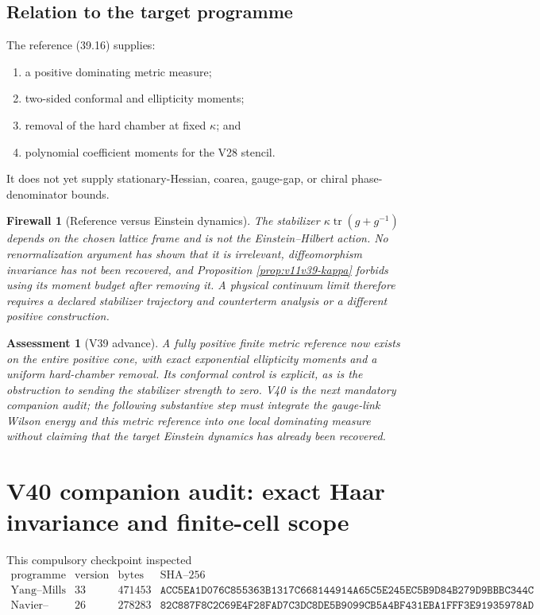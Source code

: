 \documentclass[11pt]{article}
\newtheorem{assessment}[theorem]{Assessment}
\newtheorem{firewall}[theorem]{Firewall}
\begin{document}
\subsection{Relation to the target programme}

The reference (39.16) supplies:
\begin{enumerate}[label=\textnormal{(\roman*)}]
\item a positive dominating metric measure;
\item two-sided conformal and ellipticity moments;
\item removal of the hard chamber at fixed \(\kappa\); and
\item polynomial coefficient moments for the V28 stencil.
\end{enumerate}
It does not yet supply stationary-Hessian, coarea, gauge-gap, or chiral
phase-denominator bounds.

\begin{firewall}[Reference versus Einstein dynamics]
\label{fw:v11v39-reference}
The stabilizer \(\kappa\operatorname{tr}(g+g^{-1})\) depends on the
chosen lattice frame and is not the Einstein--Hilbert action.  No
renormalization argument has shown that it is irrelevant, diffeomorphism
invariance has not been recovered, and Proposition
\ref{prop:v11v39-kappa} forbids using its moment budget after removing
it.  A physical continuum limit therefore requires a declared
stabilizer trajectory and counterterm analysis or a different positive
construction.
\end{firewall}

\begin{assessment}[V39 advance]
\label{ass:v11v39}
A fully positive finite metric reference now exists on the entire
positive cone, with exact exponential ellipticity moments and a
uniform hard-chamber removal.  Its conformal control is explicit, as is
the obstruction to sending the stabilizer strength to zero.  V40 is the
next mandatory companion audit; the following substantive step must
integrate the gauge-link Wilson energy and this metric reference into
one local dominating measure without claiming that the target Einstein
dynamics has already been recovered.
\end{assessment}
\section{V40 companion audit: exact Haar invariance and finite-cell scope}
\label{sec:v11v40}

This compulsory checkpoint inspected
\[
\begin{array}{c|c|r|l}
 \text{programme}&\text{version}&\text{bytes}&\text{SHA--256}\\ \hline
 \text{Yang--Mills}&33&471453&
 \texttt{ACC5EA1D076C855363B1317C668144914A65C5E245EC5B9D84B279D9BBBC344C}\\
 \text{Navier--Stokes}&26&278283&
 \texttt{82C887F8C2C69E4F28FAD7C3DC8DE5B9099CB5A4BF431EBA1FFF3E91935978AD}
\end{array}
\tag{40.1}
\]
\end{document}
